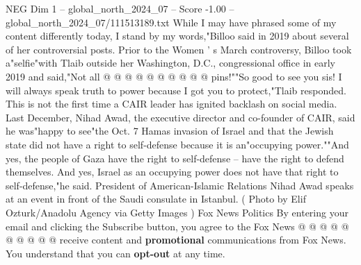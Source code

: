\begin{textsample}{NEG Dim 1 – global\_north\_2024\_07 – Score -1.00 – global\_north\_2024\_07/111513189.txt}
While I may have phrased some of my content differently today, I stand by my words,"Billoo said in 2019 about several of her controversial posts.
Prior to the Women ' s March controversy, Billoo took a"selfie"with Tlaib outside her Washington, D.C., congressional office in early 2019 and said,"Not all @ @ @ @ @ @ @ @ @ @ pins!""So good to see you sis!
I will always speak truth to power because I got you to protect,"Tlaib responded.
This is not the first time a CAIR leader has ignited backlash on social media.
Last December, Nihad Awad, the executive director and co-founder of CAIR, said he was"happy to see"the Oct. 7 Hamas invasion of Israel and that the Jewish state did not have a right to self-defense because it is an"occupying power.""And yes, the people of Gaza have the right to self-defense -- have the right to defend themselves.
And yes, Israel as an occupying power does not have that right to self-defense,"he said.
President of American-Islamic Relations Nihad Awad speaks at an event in front of the Saudi consulate in Istanbul. ( Photo by Elif Ozturk/Anadolu Agency via Getty Images ) Fox News Politics By entering your email and clicking the Subscribe button, you agree to the Fox News @ @ @ @ @ @ @ @ @ @ receive content and \textbf{promotional} communications from Fox News.
You understand that you can \textbf{opt-out} at any time.

\end{textsample}
